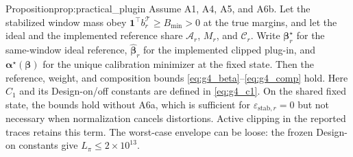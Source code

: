 \begin{restated}{Proposition}{prop:practical_plugin}
Assume A1, A4, A5, and A6b.  Let the stabilized window mass obey
$\mathbf{1}^{\top}b_r^{\mathcal T}\ge B_{\min}>0$ at the true margins, and let
the ideal and the implemented reference share $\mathcal{A}_r$, $M_r$, and
$\mathcal{C}_r$.  Write $\boldsymbol\beta_r^\star$ for the same-window ideal reference,
$\widehat{\boldsymbol\beta}_r$ for the implemented clipped plug-in, and
$\boldsymbol\alpha^\star(\boldsymbol\beta)$ for the unique calibration minimizer
at the fixed state.  Then the reference, weight, and composition bounds
\eqref{eq:g4_beta}--\eqref{eq:g4_comp} hold.
Here $C_1$ and its Design-on/off constants are defined in
\eqref{eq:g4_c1}.  On the shared fixed state, the bounds hold without A6a, which is sufficient
for $\varepsilon_{\mathrm{stab},r}=0$ but not necessary when normalization
cancels distortions.  Active clipping in the
reported traces retains this term.  The worst-case envelope can be loose:
the frozen Design-on constants give $L_\pi\le2\times10^{13}$.
\end{restated}
